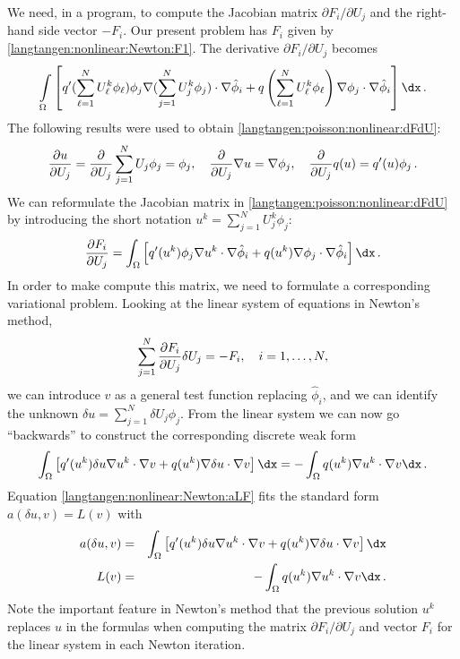 We need, in a program, to compute the Jacobian 
matrix $\partial F_i/\partial U_j$
and the right-hand side vector $-F_i$.
Our present problem has $F_i$ given by \eqref{langtangen:nonlinear:Newton:F1}.
The derivative $\partial F_i/\partial U_j$ becomes
\begin{equation}
\int\limits_\Omega \left\lbrack
 q'(\sum_{\ell=1}^NU_\ell^k\phi_\ell)\phi_j
\nabla (\sum_{j=1}^NU_j^k\phi_j)\cdot \nabla \hat\phi_i
+
q\left(\sum_{\ell=1}^NU_\ell^k\phi_\ell\right)
\nabla \phi_j \cdot \nabla \hat\phi_i
\right\rbrack
\dx\langtangenep
\label{langtangen:poisson:nonlinear:dFdU}
\end{equation}
The following results were used to obtain \eqref{langtangen:poisson:nonlinear:dFdU}:
\begin{equation}
{\partial u\over\partial U_j} = {\partial\over\partial U_j}
\sum_{j=1}^NU_j\phi_j = \phi_j,\quad {\partial\over\partial U_j}\nabla u = \nabla\phi_j,\quad {\partial\over\partial U_j}q(u) = q'(u)\phi_j\thinspace .
\end{equation}
We can reformulate the Jacobian matrix 
in \eqref{langtangen:poisson:nonlinear:dFdU} by introducing the short
notation $u^k = \sum_{j=1}^NU_j^k\phi_j$:
\begin{equation}
{\partial F_i\over\partial U_j} = 
\int_\Omega \left\lbrack
q'(u^k)\phi_j
\nabla u^k \cdot \nabla \hat\phi_i
+
q(u^k)
\nabla \phi_j \cdot \nabla \hat\phi_i
\right\rbrack
\dx\langtangenep
\end{equation}
In order to make \fenics{} compute this matrix, we need to formulate a 
corresponding variational problem. Looking at the
linear system of equations in Newton's method,
\[ \sum_{j=1}^N {\partial F_i\over\partial U_j}\delta U_j = -F_i,\quad
i=1,\ldots,N,\]
we can introduce $v$ as a general test function replacing $\hat\phi_i$,
and we can identify the unknown
$\delta u = \sum_{j=1}^N\delta U_j\phi_j$. From the linear system
we can now go ``backwards'' to construct the corresponding 
discrete weak form
\begin{equation}
\label{langtangen:nonlinear:Newton:aLF}
\int_\Omega \left\lbrack
q'(u^k)\delta u
\nabla u^k \cdot \nabla v
+
q(u^k)
\nabla \delta u\cdot \nabla v
\right\rbrack
\dx = - \int_\Omega q(u^k)
\nabla u^k\cdot \nabla v \dx\langtangenep
\end{equation}
Equation \eqref{langtangen:nonlinear:Newton:aLF} fits the standard form
$a(\delta u,v)=L(v)$ with
\begin{eqnarray*}
a(\delta u,v) &=& 
\int_\Omega \left\lbrack
q'(u^k)\delta u
\nabla u^k \cdot \nabla v
+
q(u^k)
\nabla \delta u \cdot \nabla v
\right\rbrack
\dx\\
L(v) &=& - \int_\Omega q(u^k)
\nabla u^k\cdot \nabla v \dx\langtangenep
\end{eqnarray*}
Note the important feature in Newton's method 
that the 
previous solution $u^k$ replaces $u$
in the formulas when computing the matrix
$\partial F_i/\partial U_j$ and vector $F_i$ for the linear system in
each Newton iteration.

